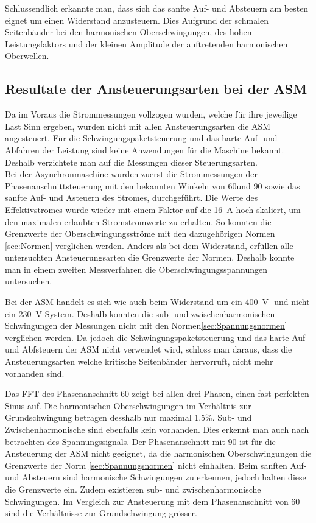 Schlussendlich erkannte man, dass sich das sanfte Auf- und Absteuern am besten eignet um einen Widerstand anzusteuern. Dies Aufgrund der schmalen Seitenbänder bei den harmonischen Oberschwingungen, des hohen Leistungsfaktors und der kleinen Amplitude der auftretenden harmonischen Oberwellen. 

\subsection{Resultate der Ansteuerungsarten bei der ASM}
Da im Voraus die Strommessungen vollzogen wurden, welche für ihre jeweilige Last Sinn ergeben, wurden nicht mit allen Ansteuerungsarten die ASM angesteuert. Für die Schwingungspaketsteuerung und das harte Auf- und Abfahren der Leistung sind keine Anwendungen für die Maschine bekannt. Deshalb verzichtete man auf die Messungen dieser Steuerungsarten.\\

Bei der Asynchronmaschine wurden zuerst die Strommessungen der Phasenanschnittsteuerung mit den bekannten Winkeln von 60\textdegree und 90\textdegree \hspace{0.02cm} sowie das sanfte Auf- und Asteuern des Stromes, durchgeführt. Die Werte des Effektivstromes wurde wieder mit einem Faktor auf die \SI{16}{A} hoch skaliert, um den maximalen erlaubten Stromstromwerte zu erhalten. So konnten die Grenzwerte der Oberschwingungsströme mit den dazugehörigen Normen \ref{sec:Normen} verglichen werden. Anders als bei dem Widerstand, erfüllen alle untersuchten Ansteuerungsarten die Grenzwerte der Normen. Deshalb konnte man in einem zweiten Messverfahren die Oberschwingungsspannungen untersuchen.

Bei der ASM handelt es sich wie auch beim Widerstand um ein \SI{400}{V}- und nicht ein \SI{230}{V}-System. Deshalb konnten die sub- und zwischenharmonischen Schwingungen der Messungen nicht mit den Normen\ref{sec:Spannungsnormen} verglichen werden.
Da jedoch die Schwingungspaketsteuerung und das harte Auf- und Abfsteuern der ASM nicht verwendet wird, schloss man daraus, dass die Ansteuerungsarten welche kritische Seitenbänder hervorruft, nicht mehr vorhanden sind. 


Das FFT des Phasenanschnitt 60\textdegree \hspace{0.02cm} zeigt bei allen drei Phasen, einen fast perfekten Sinus auf.
Die harmonischen Oberschwingungen im Verhältnis zur Grundschwingung betragen desshalb nur maximal 1.5\%. Sub- und Zwischenharmonische sind ebenfalls kein vorhanden. Dies erkennt man auch nach betrachten des Spannungssignals.
Der Phasenanschnitt mit 90\textdegree \hspace{0.02cm} ist für die Ansteuerung der ASM nicht geeignet, da die harmonischen Oberschwingungen die Grenzwerte der Norm \ref{sec:Spannungsnormen} nicht einhalten. 
Beim sanften Auf- und Absteuern sind harmonische Schwingungen zu erkennen, jedoch halten diese die Grenzwerte ein. Zudem existieren sub- und zwischenharmonische Schwingungen. Im Vergleich zur Ansteuerung mit dem Phasenanschnitt von 60\textdegree \hspace{0.02cm} sind die Verhältnisse zur Grundschwingung grösser.\\ 

